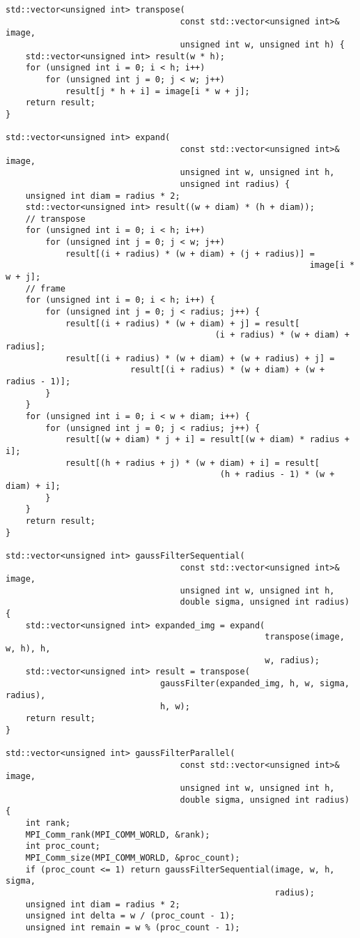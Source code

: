 \documentclass{report}
\begin{document}
\begin{lstlisting}
std::vector<unsigned int> transpose(
                                   const std::vector<unsigned int>& image,
                                   unsigned int w, unsigned int h) {
    std::vector<unsigned int> result(w * h);
    for (unsigned int i = 0; i < h; i++)
        for (unsigned int j = 0; j < w; j++)
            result[j * h + i] = image[i * w + j];
    return result;
}

std::vector<unsigned int> expand(
                                   const std::vector<unsigned int>& image,
                                   unsigned int w, unsigned int h,
                                   unsigned int radius) {
    unsigned int diam = radius * 2;
    std::vector<unsigned int> result((w + diam) * (h + diam));
    // transpose
    for (unsigned int i = 0; i < h; i++)
        for (unsigned int j = 0; j < w; j++)
            result[(i + radius) * (w + diam) + (j + radius)] =
                                                             image[i * w + j];
    // frame
    for (unsigned int i = 0; i < h; i++) {
        for (unsigned int j = 0; j < radius; j++) {
            result[(i + radius) * (w + diam) + j] = result[
                                          (i + radius) * (w + diam) + radius];
            result[(i + radius) * (w + diam) + (w + radius) + j] =
                         result[(i + radius) * (w + diam) + (w + radius - 1)];
        }
    }
    for (unsigned int i = 0; i < w + diam; i++) {
        for (unsigned int j = 0; j < radius; j++) {
            result[(w + diam) * j + i] = result[(w + diam) * radius + i];
            result[(h + radius + j) * (w + diam) + i] = result[
                                           (h + radius - 1) * (w + diam) + i];
        }
    }
    return result;
}

std::vector<unsigned int> gaussFilterSequential(
                                   const std::vector<unsigned int>& image,
                                   unsigned int w, unsigned int h,
                                   double sigma, unsigned int radius) {
    std::vector<unsigned int> expanded_img = expand(
                                                    transpose(image, w, h), h,
                                                    w, radius);
    std::vector<unsigned int> result = transpose(
                               gaussFilter(expanded_img, h, w, sigma, radius),
                               h, w);
    return result;
}

std::vector<unsigned int> gaussFilterParallel(
                                   const std::vector<unsigned int>& image,
                                   unsigned int w, unsigned int h,
                                   double sigma, unsigned int radius) {
    int rank;
    MPI_Comm_rank(MPI_COMM_WORLD, &rank);
    int proc_count;
    MPI_Comm_size(MPI_COMM_WORLD, &proc_count);
    if (proc_count <= 1) return gaussFilterSequential(image, w, h, sigma,
                                                      radius);
    unsigned int diam = radius * 2;
    unsigned int delta = w / (proc_count - 1);
    unsigned int remain = w % (proc_count - 1);


\end{lstlisting}
\end{document}
